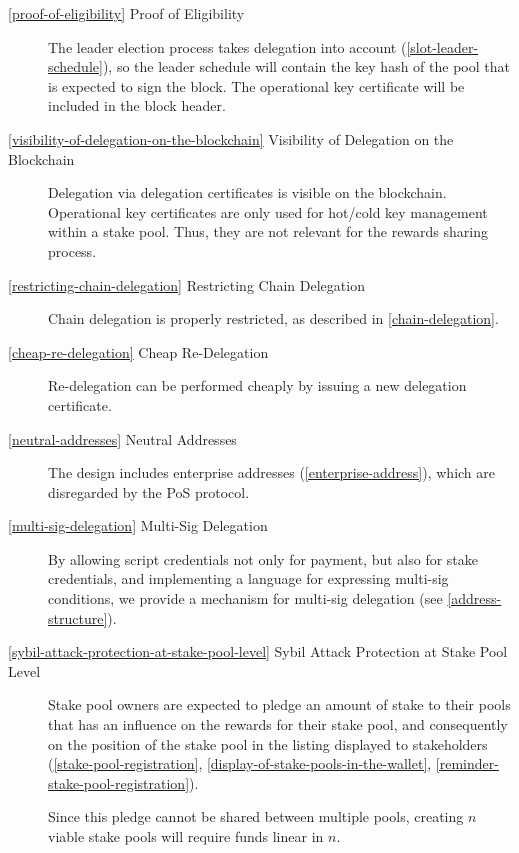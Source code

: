 \documentclass[11pt,a4paper,dvipsnames,twosided]{article}
\begin{document}
\begin{description}

\item[\cref{proof-of-eligibility} Proof of Eligibility] The leader election
  process takes delegation into account (\cref{slot-leader-schedule}), so the
  leader schedule will contain the key hash of the pool that is expected to sign
  the block. The operational key certificate will be included in the block
  header.

\item[\cref{visibility-of-delegation-on-the-blockchain} Visibility of Delegation
  on the Blockchain] Delegation via delegation certificates is visible on the
  blockchain. Operational key certificates are only used for hot/cold key
  management within a stake pool. Thus, they are not relevant for the rewards
  sharing process.

\item[\cref{restricting-chain-delegation} Restricting Chain
  Delegation] Chain delegation is properly restricted, as described in
  \cref{chain-delegation}.

\item[\cref{cheap-re-delegation} Cheap Re-Delegation] Re-delegation can
  be performed cheaply by issuing a new delegation certificate.

\item[\cref{neutral-addresses} Neutral Addresses] The design includes
  enterprise addresses (\cref{enterprise-address}), which are
  disregarded by the PoS protocol.

\item[\cref{multi-sig-delegation} Multi-Sig Delegation] By allowing script
  credentials not only for payment, but also for stake credentials, and
  implementing a language for expressing multi-sig conditions, we provide a
  mechanism for multi-sig delegation (see \cref{address-structure}).

\item[\cref{sybil-attack-protection-at-stake-pool-level} Sybil Attack
  Protection at Stake Pool Level] Stake pool owners are expected to
  pledge an amount of stake to their pools that has an influence on
  the rewards for their stake pool, and consequently on the
  position of the stake pool in the listing displayed to stakeholders
  (\cref{stake-pool-registration},
  \cref{display-of-stake-pools-in-the-wallet},
  \cref{reminder-stake-pool-registration}).

  Since this pledge cannot be shared between multiple pools, creating
  $n$ viable stake pools will require funds linear in $n$.


\end{description}
\end{document}
